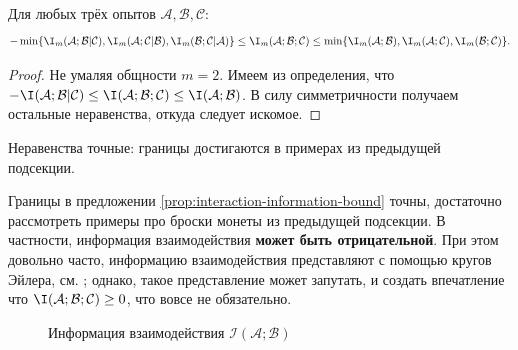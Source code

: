 \begin{proposition}
	\label{prop:interaction-information-bound}
	Для любых трёх опытов $\mathcal{A}, \mathcal{B}, \mathcal{C}$:
	\[
		-\min\{\I_m(\mathcal{A};\mathcal{B} | \mathcal{C}), \I_m(\mathcal{A};\mathcal{C} | \mathcal{B}), \I_m(\mathcal{B};\mathcal{C} | \mathcal{A})\} \leq \I_m(\mathcal{A};\mathcal{B};\mathcal{C}) \leq \min\{\I_m(\mathcal{A};\mathcal{B}), \I_m(\mathcal{A};\mathcal{C}), \I_m(\mathcal{B};\mathcal{C})\}.
	\]
\end{proposition}
\begin{proof}
	Не умаляя общности $m = 2$. Имеем из определения, что $-\I(\mathcal{A};\mathcal{B} | \mathcal{C}) \leq \I(\mathcal{A};\mathcal{B};\mathcal{C}) \leq \I(\mathcal{A};\mathcal{B})$. В силу симметричности получаем остальные неравенства, откуда следует искомое.
\end{proof}
\begin{remark}
	Неравенства точные: границы достигаются в примерах из предыдущей подсекции.
\end{remark}
\newpage

\begin{remark}
	Границы в предложении \ref{prop:interaction-information-bound} точны, достаточно рассмотреть примеры про броски монеты из предыдущей подсекции. В частности, информация взаимодействия \textbf{может быть отрицательной}. При этом довольно часто, информацию взаимодействия представляют с помощью кругов Эйлера, см. ; однако, такое представление может запутать, и создать впечатление что $\I(\mathcal{A}; \mathcal{B};\mathcal{C}) \geq 0$, что вовсе не обязательно.

\begin{figure}[!ht]
\centering
{}
\caption{Информация взаимодействия $\mathcal{I}(\mathcal{A}; \mathcal{B})$}
\label{fig:interaction-info}
\end{figure}
\end{remark}

